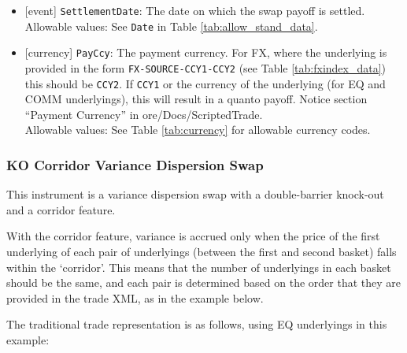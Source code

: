 \begin{itemize}
  \item{}[event] \lstinline!SettlementDate!: The date on which the swap payoff is settled. \\
  Allowable values: See \lstinline!Date! in Table \ref{tab:allow_stand_data}.
  \item{}[currency] \lstinline!PayCcy!: The payment currency. For FX, where the underlying is provided
      in the form \lstinline!FX-SOURCE-CCY1-CCY2! (see Table \ref{tab:fxindex_data}) this should
      be \lstinline!CCY2!. If \lstinline!CCY1! or the currency of the underlying (for EQ and
      COMM underlyings), this will result in a quanto payoff. Notice section ``Payment Currency'' in ore/Docs/ScriptedTrade. \\
        Allowable values: See Table \ref{tab:currency} for allowable currency codes.
\end{itemize}

\subsubsection{KO Corridor Variance Dispersion Swap}

This instrument is a variance dispersion swap with a double-barrier knock-out and a corridor feature.

With the corridor feature, variance is accrued only when the price of the first underlying of each pair of
underlyings (between the first and second basket) falls within the `corridor'. This means that the number of
underlyings in each basket should be the same, and each pair is determined based on the order that they are
provided in the trade XML, as in the example below.

The traditional trade representation is as follows, using EQ underlyings in this example:

